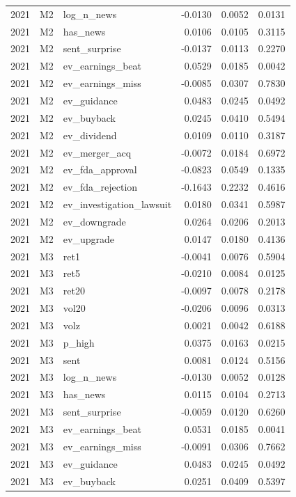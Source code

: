 \begin{tabular}{rllrrr}
2021 & M2 & log\_n\_news & -0.0130 & 0.0052 & 0.0131 \\
2021 & M2 & has\_news & 0.0106 & 0.0105 & 0.3115 \\
2021 & M2 & sent\_surprise & -0.0137 & 0.0113 & 0.2270 \\
2021 & M2 & ev\_earnings\_beat & 0.0529 & 0.0185 & 0.0042 \\
2021 & M2 & ev\_earnings\_miss & -0.0085 & 0.0307 & 0.7830 \\
2021 & M2 & ev\_guidance & 0.0483 & 0.0245 & 0.0492 \\
2021 & M2 & ev\_buyback & 0.0245 & 0.0410 & 0.5494 \\
2021 & M2 & ev\_dividend & 0.0109 & 0.0110 & 0.3187 \\
2021 & M2 & ev\_merger\_acq & -0.0072 & 0.0184 & 0.6972 \\
2021 & M2 & ev\_fda\_approval & -0.0823 & 0.0549 & 0.1335 \\
2021 & M2 & ev\_fda\_rejection & -0.1643 & 0.2232 & 0.4616 \\
2021 & M2 & ev\_investigation\_lawsuit & 0.0180 & 0.0341 & 0.5987 \\
2021 & M2 & ev\_downgrade & 0.0264 & 0.0206 & 0.2013 \\
2021 & M2 & ev\_upgrade & 0.0147 & 0.0180 & 0.4136 \\
2021 & M3 & ret1 & -0.0041 & 0.0076 & 0.5904 \\
2021 & M3 & ret5 & -0.0210 & 0.0084 & 0.0125 \\
2021 & M3 & ret20 & -0.0097 & 0.0078 & 0.2178 \\
2021 & M3 & vol20 & -0.0206 & 0.0096 & 0.0313 \\
2021 & M3 & volz & 0.0021 & 0.0042 & 0.6188 \\
2021 & M3 & p\_high & 0.0375 & 0.0163 & 0.0215 \\
2021 & M3 & sent & 0.0081 & 0.0124 & 0.5156 \\
2021 & M3 & log\_n\_news & -0.0130 & 0.0052 & 0.0128 \\
2021 & M3 & has\_news & 0.0115 & 0.0104 & 0.2713 \\
2021 & M3 & sent\_surprise & -0.0059 & 0.0120 & 0.6260 \\
2021 & M3 & ev\_earnings\_beat & 0.0531 & 0.0185 & 0.0041 \\
2021 & M3 & ev\_earnings\_miss & -0.0091 & 0.0306 & 0.7662 \\
2021 & M3 & ev\_guidance & 0.0483 & 0.0245 & 0.0492 \\
2021 & M3 & ev\_buyback & 0.0251 & 0.0409 & 0.5397 \\

\end{tabular}
